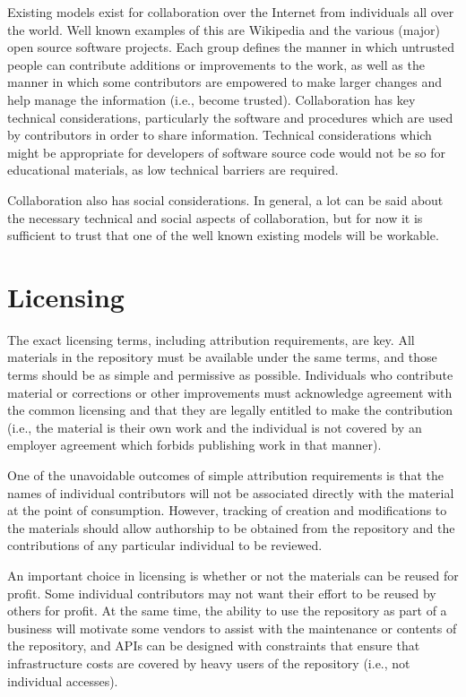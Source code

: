 Existing models exist for collaboration over the Internet from individuals
all over the world.  Well known examples of this are Wikipedia and the
various (major) open source software projects.  Each group defines the 
manner in which untrusted people can contribute additions or improvements to
the work, as well as the manner in which some contributors are empowered to
make larger changes and help manage the information (i.e., become trusted).
Collaboration has
key technical considerations, particularly the software and procedures which
are used by contributors in order to share information.  Technical considerations
which might be appropriate for developers of software source code would not
be so for educational materials, as low technical barriers are required.

Collaboration also has social considerations.  In general, a lot can be said
about the necessary technical and social aspects of collaboration, but for
now it is sufficient to trust that one of the well known existing models will
be workable.

\section*{Licensing}

The exact licensing terms, including attribution requirements, are key.  All materials in the
repository must be available under the same terms, and those terms should be as simple
and permissive as possible.  Individuals who contribute material or corrections or other 
improvements must acknowledge agreement with the common licensing and that
they are legally entitled to make the contribution (i.e., the material is
their own work and the individual is not covered by an employer agreement
which forbids publishing work in that manner).

One of the unavoidable outcomes of simple attribution requirements is that
the names of individual contributors
will not be associated directly with the material at the point of consumption.
However, tracking of creation and modifications to the materials should allow 
authorship to be obtained from the repository and the contributions of any
particular individual to be reviewed.

An important choice in licensing is whether or not the materials can be reused
for profit.  Some individual contributors may not want their effort to be 
reused by others for profit.  At the same time, the ability to use the 
repository as part of a business will motivate some vendors to assist with
the maintenance or contents of the repository, and APIs can be designed with
constraints that ensure that infrastructure costs are covered by heavy
users of the repository (i.e., not individual accesses).

